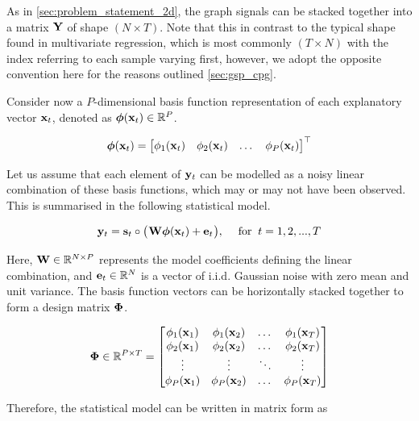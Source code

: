 As in \cref{sec:problem_statement_2d}, the graph signals can be stacked together into a matrix $\mathbf{Y}$ of shape $(N \times T)$. Note that this in contrast to the typical shape found in multivariate regression, which is most commonly $(T \times N)$ with the index referring to each sample varying first, however, we adopt the opposite convention here for the reasons outlined \cref{sec:gsp_cpg}. 

Consider now a $P$-dimensional basis function representation of each explanatory vector $\mathbf{x}_t$, denoted as $\boldsymbol{\phi}(\mathbf{x}_t) \in \mathbb{R}^{P}$. 

\begin{equation}
    \boldsymbol{\phi}(\mathbf{x}_t) = 
    \begin{bmatrix}
        \phi_1(\mathbf{x}_t) & \phi_2(\mathbf{x}_t) & \dots & \phi_P(\mathbf{x}_t)
    \end{bmatrix}^\top
\end{equation}

Let us assume that each element of $\mathbf{y}_t$ can be modelled as a noisy linear combination of these basis functions, which may or may not have been observed. This is summarised in the following statistical model. 

\begin{equation}
    \mathbf{y}_t = \mathbf{s}_t \circ \big( \mspace{1mu} \mathbf{W} \boldsymbol{\phi}(\mathbf{x}_t) + \mathbf{e}_t \mspace{1mu} \big), \quad \; \text{for} \; \; t = 1, 2, ..., T
\end{equation}

Here, $\mathbf{W} \in \mathbb{R}^{N \times P}$ represents the model coefficients defining the linear combination, and $\mathbf{e}_t \in \mathbb{R}^{N}$ is a vector of i.i.d. Gaussian noise with zero mean and unit variance. The basis function vectors can be horizontally stacked together to form a design matrix $\mathbf{\Phi}$. 

\begin{equation}
    \mathbf{\Phi} \in \mathbb{R}^{P \times T} = \begin{bmatrix} 
        \phi_1(\mathbf{x}_1) & \phi_1(\mathbf{x}_2) & \dots & \phi_1(\mathbf{x}_T) \\
        \phi_2(\mathbf{x}_1) & \phi_2(\mathbf{x}_2) & \dots & \phi_2(\mathbf{x}_T) \\
        \vdots & \vdots & \ddots & \vdots  \\
        \phi_P(\mathbf{x}_1) & \phi_P(\mathbf{x}_2) & \dots & \phi_P(\mathbf{x}_T) \\
    \end{bmatrix}
\end{equation}

Therefore, the statistical model can be written in matrix form as 


